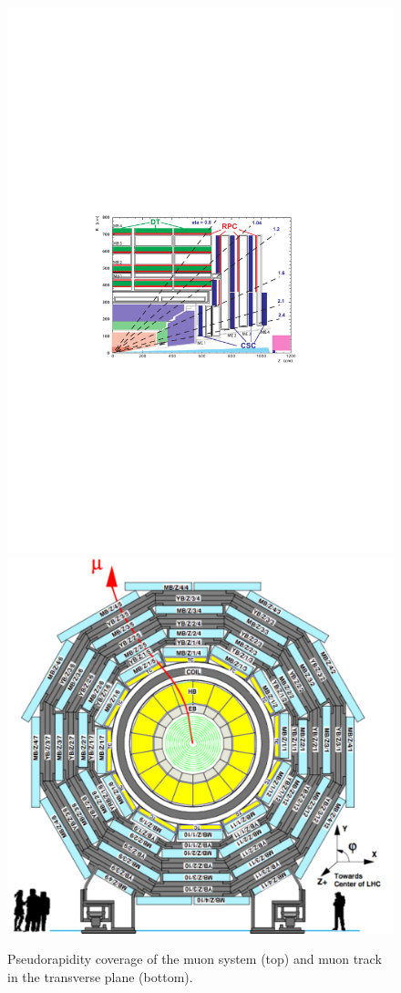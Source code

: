 \begin{figure}[p]
\centering
\includegraphics[scale=1.1]{figures/experiment/muonDetectors_eta.pdf}\\
\includegraphics[scale=0.5]{figures/experiment/DT1.pdf}
\caption[Pseudorapidity coverage of the muon system]{Pseudorapidity coverage of the muon system (top) and muon track in the transverse plane (bottom).}
\label{muoneta}
\end{figure}

